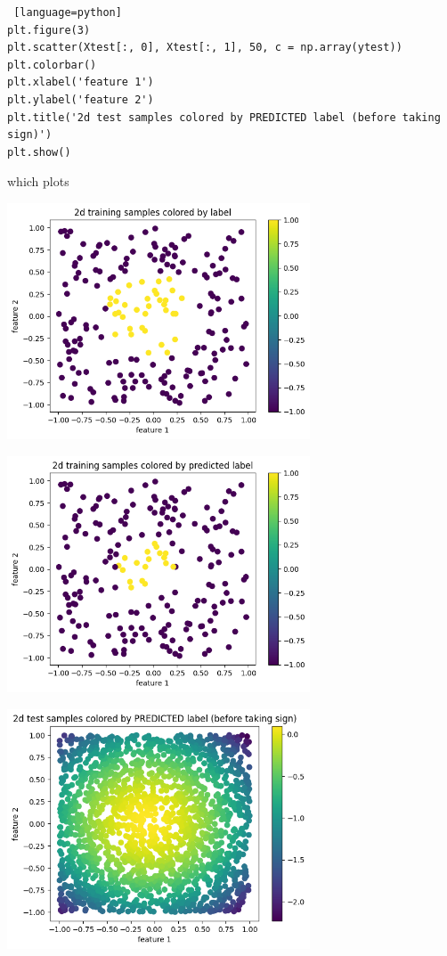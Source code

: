 \documentclass[a4paper, 12pt]{article}
\begin{document}
\begin{solution}
\begin{lstlisting} [language=python]
plt.figure(3)
plt.scatter(Xtest[:, 0], Xtest[:, 1], 50, c = np.array(ytest))
plt.colorbar()
plt.xlabel('feature 1') 
plt.ylabel('feature 2')
plt.title('2d test samples colored by PREDICTED label (before taking sign)')
plt.show()
\end{lstlisting}
which plots
\begin{center}
\includegraphics[width=9cm]{./figures/6.1d.1.png}
\end{center}
\begin{center}
\includegraphics[width=9cm]{./figures/6.1d.2.png}
\end{center}
\begin{center}
\includegraphics[width=9cm]{./figures/6.1d.3.png}
\end{center}
\end{solution}
\end{document}
